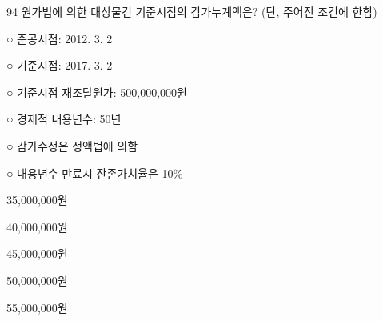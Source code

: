 \begin{question}{94}
원가법에 의한 대상물건 기준시점의 감가누계액은? (단, 주어진 조건에 한함)
\begin{framedtext}
○ 준공시점: 2012. 3. 2 \par
○ 기준시점: 2017. 3. 2 \par
○ 기준시점 재조달원가: 500,000,000원 \par
○ 경제적 내용년수: 50년 \par
○ 감가수정은 정액법에 의함 \par
○ 내용년수 만료시 잔존가치율은 10\%
\end{framedtext}
\begin{choices}
  \item 35,000,000원
  \item 40,000,000원
  \item 45,000,000원
  \item 50,000,000원
  \item 55,000,000원
\end{choices}
\end{question}
